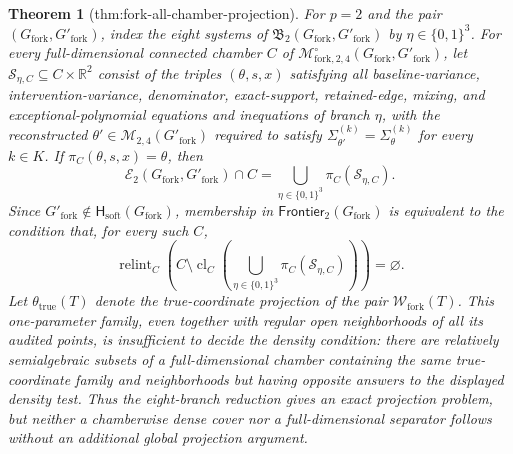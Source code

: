 \documentclass{article}
\newtheorem{theorem}{Theorem}
\begin{document}
\begin{theorem}[thm:fork-all-chamber-projection]\label{thm:fork-all-chamber-projection}
For \(p=2\) and the pair \((G_{\mathrm{fork}},G'_{\mathrm{fork}})\), index the eight systems of \(\mathfrak B_2(G_{\mathrm{fork}},G'_{\mathrm{fork}})\) by \(\eta\in\{0,1\}^3\). For every full-dimensional connected chamber \(C\) of \(\mathcal M^{\circ}_{\mathrm{fork},2,4}(G_{\mathrm{fork}},G'_{\mathrm{fork}})\), let \(\mathscr S_{\eta,C}\subseteq C\times\mathbb R^2\) consist of the triples \((\theta,s,x)\) satisfying all baseline-variance, intervention-variance, denominator, exact-support, retained-edge, mixing, and exceptional-polynomial equations and inequations of branch \(\eta\), with the reconstructed \(\theta'\in\mathcal M_{2,4}(G'_{\mathrm{fork}})\) required to satisfy \(\Sigma_{\theta'}^{(k)}=\Sigma_{\theta}^{(k)}\) for every \(k\in K\). If \(\pi_C(\theta,s,x)=\theta\), then
\[
 \mathcal E_2(G_{\mathrm{fork}},G'_{\mathrm{fork}})\cap C
 =\bigcup_{\eta\in\{0,1\}^3}\pi_C(\mathscr S_{\eta,C}).
\]
Since \(G'_{\mathrm{fork}}\notin\mathsf H_{\mathrm{soft}}(G_{\mathrm{fork}})\), membership in \(\mathsf{Frontier}_2(G_{\mathrm{fork}})\) is equivalent to the condition that, for every such \(C\),
\[
 \operatorname{relint}_C\!\left(
 C\setminus\operatorname{cl}_C
 \left(\bigcup_{\eta\in\{0,1\}^3}\pi_C(\mathscr S_{\eta,C})\right)
 \right)=\varnothing.
\]
Let \(\theta_{\mathrm{true}}(T)\) denote the true-coordinate projection of the pair \(\mathcal W_{\mathrm{fork}}(T)\). This one-parameter family, even together with regular open neighborhoods of all its audited points, is insufficient to decide the density condition: there are relatively semialgebraic subsets of a full-dimensional chamber containing the same true-coordinate family and neighborhoods but having opposite answers to the displayed density test. Thus the eight-branch reduction gives an exact projection problem, but neither a chamberwise dense cover nor a full-dimensional separator follows without an additional global projection argument.
\end{theorem}
\end{document}
